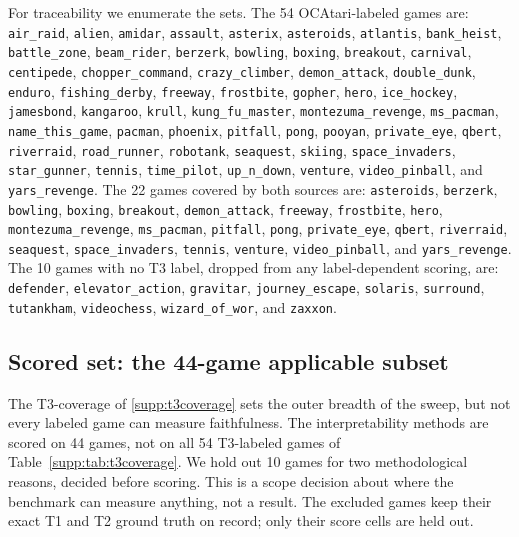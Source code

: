For traceability we enumerate the sets. The 54 OCAtari-labeled games are:
\texttt{air\_raid}, \texttt{alien}, \texttt{amidar}, \texttt{assault}, \texttt{asterix},
\texttt{asteroids}, \texttt{atlantis}, \texttt{bank\_heist}, \texttt{battle\_zone},
\texttt{beam\_rider}, \texttt{berzerk}, \texttt{bowling}, \texttt{boxing}, \texttt{breakout},
\texttt{carnival}, \texttt{centipede}, \texttt{chopper\_command}, \texttt{crazy\_climber},
\texttt{demon\_attack}, \texttt{double\_dunk}, \texttt{enduro}, \texttt{fishing\_derby},
\texttt{freeway}, \texttt{frostbite}, \texttt{gopher}, \texttt{hero}, \texttt{ice\_hockey},
\texttt{jamesbond}, \texttt{kangaroo}, \texttt{krull}, \texttt{kung\_fu\_master},
\texttt{montezuma\_revenge}, \texttt{ms\_pacman}, \texttt{name\_this\_game}, \texttt{pacman},
\texttt{phoenix}, \texttt{pitfall}, \texttt{pong}, \texttt{pooyan}, \texttt{private\_eye},
\texttt{qbert}, \texttt{riverraid}, \texttt{road\_runner}, \texttt{robotank}, \texttt{seaquest},
\texttt{skiing}, \texttt{space\_invaders}, \texttt{star\_gunner}, \texttt{tennis},
\texttt{time\_pilot}, \texttt{up\_n\_down}, \texttt{venture}, \texttt{video\_pinball}, and
\texttt{yars\_revenge}. The 22 games covered by both sources are:
\texttt{asteroids}, \texttt{berzerk}, \texttt{bowling}, \texttt{boxing}, \texttt{breakout},
\texttt{demon\_attack}, \texttt{freeway}, \texttt{frostbite}, \texttt{hero},
\texttt{montezuma\_revenge}, \texttt{ms\_pacman}, \texttt{pitfall}, \texttt{pong},
\texttt{private\_eye}, \texttt{qbert}, \texttt{riverraid}, \texttt{seaquest},
\texttt{space\_invaders}, \texttt{tennis}, \texttt{venture}, \texttt{video\_pinball}, and
\texttt{yars\_revenge}. The 10 games with no T3 label, dropped from any label-dependent scoring,
are: \texttt{defender}, \texttt{elevator\_action}, \texttt{gravitar}, \texttt{journey\_escape},
\texttt{solaris}, \texttt{surround}, \texttt{tutankham}, \texttt{videochess},
\texttt{wizard\_of\_wor}, and \texttt{zaxxon}.

\subsection{Scored set: the 44-game applicable subset}\label{supp:scoredset}

The T3-coverage of \Sectionname\ref{supp:t3coverage} sets the outer breadth of the sweep,
but not every labeled game can measure faithfulness. The interpretability methods are scored on
44 games, not on all 54 T3-labeled games of Table~\ref{supp:tab:t3coverage}. We hold out 10
games for two methodological reasons, decided before scoring. This is a scope decision about
where the benchmark can measure anything, not a result. The excluded games keep their exact T1
and T2 ground truth on record; only their score cells are held out.

